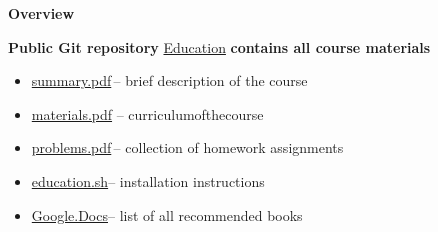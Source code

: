 \documentclass{beamer}
\begin{document}
\begin{frame}{\bf Overview}

    \begin{block}
    \justifying \textbf{Public Git repository} \href{https://github.com/i-s-m-mipt/Education}{\color{G} Education} \textbf{contains all course materials}
    \end{block}
    
    \begin{itemize}

        \item \href{https://github.com/i-s-m-mipt/Education/blob/master/summary.pdf}{\color{G} summary.pdf}\:\,-- brief description of the course

        \item \href{https://github.com/i-s-m-mipt/Education/blob/master/materials.pdf}{\color{G} materials.pdf} -- curriculum\:of\:the\:course

        \item \href{https://github.com/i-s-m-mipt/Education/blob/master/problems.pdf}{\color{G} problems.pdf}\:\,-- collection of homework assignments

        \item \href{https://github.com/i-s-m-mipt/Education/blob/master/education.sh}{\color{G} education.sh}\;\:-- installation instructions

        \item \href{https://docs.google.com/spreadsheets/d/1MAx4-DoZUrZEB210XJ524e-0OogZRvH7QBorja_tGiw/edit?gid=0#gid=0}{\color{G} Google.Docs}\:\:-- list of all recommended books
        
    \end{itemize}

\end{frame}
\end{document}
